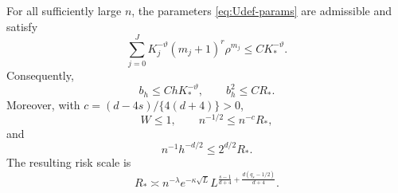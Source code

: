 \begin{lemma}[Allocation]\label{lem:U12}\label{lem:U13}
For all sufficiently large $n$, the parameters \eqref{eq:Udef-params}
are admissible and satisfy
\begin{equation}\label{eq:U12-sum}
 \sum_{j=0}^J K_j^{-\vartheta}(m_j+1)^r\rho^{m_j}
 \le CK_*^{-\vartheta}.
\end{equation}
Consequently,
\begin{equation}\label{eq:U12-bias}
 b_h\le ChK_*^{-\vartheta},\qquad b_h^2\le CR_*.
\end{equation}
Moreover, with $c=(d-4s)/\{4(d+4)\}>0$,
\begin{equation}\label{eq:U13-sums}
 W\le1,\qquad n^{-1/2}\le n^{-c}R_*,
\end{equation}
and
\begin{equation}\label{eq:U13-pairs}
 n^{-1}h^{-d/2}\le2^{d/2}R_*.
\end{equation}
The resulting risk scale is
\begin{equation}\label{eq:Urate-R}
 R_*\asymp n^{-\lambda}e^{-\kappa\sqrt L}
 L^{\frac{s-1}{d+4}+\frac{d(q_s-1/2)}{d+4}}.
\end{equation}
\end{lemma}

